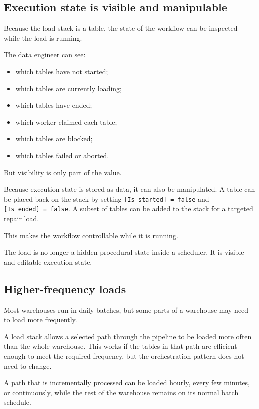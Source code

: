 \documentclass[10pt,openany,10pt]{book}
\providecommand{\tightlist}{%
  \setlength{\itemsep}{0pt}\setlength{\parskip}{0pt}}
\begin{document}
\subsection{Execution state is visible and
manipulable}\label{execution-state-is-visible-and-manipulable}

Because the load stack is a table, the state of the workflow can be
inspected while the load is running.

The data engineer can see:

\begin{itemize}
\tightlist
\item
  which tables have not started;
\item
  which tables are currently loading;
\item
  which tables have ended;
\item
  which worker claimed each table;
\item
  which tables are blocked;
\item
  which tables failed or aborted.
\end{itemize}

But visibility is only part of the value.

Because execution state is stored as data, it can also be manipulated. A
table can be placed back on the stack by setting
\texttt{{[}Is\ started{]}\ =\ false} and
\texttt{{[}Is\ ended{]}\ =\ false}. A subset of tables can be added to
the stack for a targeted repair load.

This makes the workflow controllable while it is running.

The load is no longer a hidden procedural state inside a scheduler. It
is visible and editable execution state.

\subsection{Higher-frequency loads}\label{higher-frequency-loads}

Most warehouses run in daily batches, but some parts of a warehouse may
need to load more frequently.

A load stack allows a selected path through the pipeline to be loaded
more often than the whole warehouse. This works if the tables in that
path are efficient enough to meet the required frequency, but the
orchestration pattern does not need to change.

A path that is incrementally processed can be loaded hourly, every few
minutes, or continuously, while the rest of the warehouse remains on its
normal batch schedule.
\end{document}
